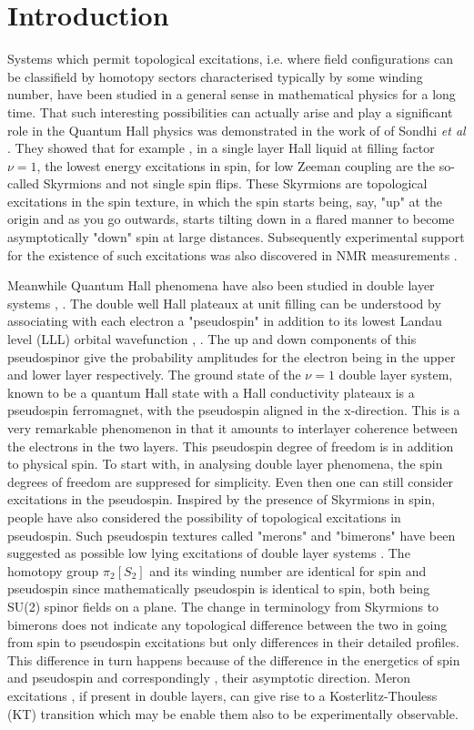 \section{Introduction}
Systems which permit topological excitations, i.e. where  field
configurations can be classifield by  homotopy sectors
characterised typically by some winding number, have been
studied in a general sense in mathematical physics for a long
time.  That such interesting possibilities can actually arise
and play a significant role in the Quantum Hall physics was
demonstrated in the work of  of Sondhi {\it et al} \cite
{Sondhi}. They showed that for example , in a single layer Hall
liquid at filling factor $\nu = 1$, the lowest energy
excitations in spin, for low Zeeman coupling  are the so-called
Skyrmions and not single spin flips.  These Skyrmions are
topological excitations in the spin texture, in which the spin
starts being, say, "up"  at the origin and as you go outwards,
starts tilting down in a flared manner to become asymptotically
"down" spin at large distances.  Subsequently experimental
support for the existence of such excitations was also
discovered in NMR measurements \cite {Barrett}.

Meanwhile  Quantum Hall phenomena have also been studied in
double layer systems \cite{Eisen}, \cite{Tapas}. The double well
Hall plateaux at unit filling can be understood by associating with
each electron a "pseudospin" in addition to its   lowest Landau
level (LLL) orbital wavefunction \cite{GirvMac}, \cite{Moon}.
The up and down components of this pseudospinor give the
probability amplitudes for the electron being in the upper and
lower layer respectively. The ground state of the $\nu = 1 $
double layer system, known to be a quantum Hall state with a
Hall conductivity plateaux is a pseudospin ferromagnet, with the
pseudospin aligned in the x-direction.  This is a very
remarkable phenomenon in that it amounts to interlayer coherence
between the electrons in the two layers.  This pseudospin degree
of freedom is in addition to physical spin.  To start with, in
analysing double layer phenomena, the spin degrees of freedom
are suppresed for simplicity. Even then one can still consider
excitations in the pseudospin. Inspired by the presence of
Skyrmions in spin, people have also considered the possibility
of topological excitations in pseudospin.   Such pseudospin
textures called "merons" and "bimerons" have been suggested as
possible low lying excitations of double layer systems
\cite{GirvMac}. The homotopy group $\pi_{2}[S_{2}]$ and its
winding number are identical for spin and pseudospin since
mathematically pseudospin is identical to spin, both being SU(2)
spinor fields on a plane.  The change in  terminology  from
Skyrmions to bimerons does not indicate any topological
difference between the two in going from spin to pseudospin
excitations but only differences in their detailed profiles.
This difference in turn happens because of the difference in the
energetics of  spin and pseudospin and correspondingly , their
asymptotic direction.  Meron  excitations , if present in double
layers, can give rise to a Kosterlitz-Thouless (KT) \cite{KT}
transition which may be enable them also to be  experimentally
observable.
    
